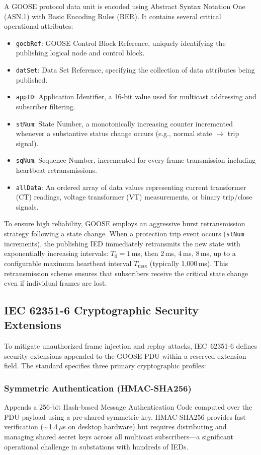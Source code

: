 \documentclass{ieeeaccess}
\begin{document}
A GOOSE protocol data unit is encoded using Abstract Syntax Notation One (ASN.1) with Basic Encoding Rules (BER). It contains several critical operational attributes:
\begin{itemize}[leftmargin=*]
    \item \texttt{gocbRef}: GOOSE Control Block Reference, uniquely identifying the publishing logical node and control block.
    \item \texttt{datSet}: Data Set Reference, specifying the collection of data attributes being published.
    \item \texttt{appID}: Application Identifier, a 16-bit value used for multicast addressing and subscriber filtering.
    \item \texttt{stNum}: State Number, a monotonically increasing counter incremented whenever a substantive status change occurs (e.g., normal state $\rightarrow$ trip signal).
    \item \texttt{sqNum}: Sequence Number, incremented for every frame transmission including heartbeat retransmissions.
    \item \texttt{allData}: An ordered array of data values representing current transformer (CT) readings, voltage transformer (VT) measurements, or binary trip/close signals.
\end{itemize}

To ensure high reliability, GOOSE employs an aggressive burst retransmission strategy following a state change. When a protection trip event occurs (\texttt{stNum} increments), the publishing IED immediately retransmits the new state with exponentially increasing intervals: $T_0 = 1$\,ms, then 2\,ms, 4\,ms, 8\,ms, up to a configurable maximum heartbeat interval $T_{\max}$ (typically 1,000\,ms). This retransmission scheme ensures that subscribers receive the critical state change even if individual frames are lost.

\subsection{IEC 62351-6 Cryptographic Security Extensions}
To mitigate unauthorized frame injection and replay attacks, IEC~62351-6 defines security extensions appended to the GOOSE PDU within a reserved extension field. The standard specifies three primary cryptographic profiles:

\subsubsection{Symmetric Authentication (HMAC-SHA256)}
Appends a 256-bit Hash-based Message Authentication Code computed over the PDU payload using a pre-shared symmetric key. HMAC-SHA256 provides fast verification ($\sim$1.4\,$\mu$s on desktop hardware) but requires distributing and managing shared secret keys across all multicast subscribers---a significant operational challenge in substations with hundreds of IEDs.
\end{document}
